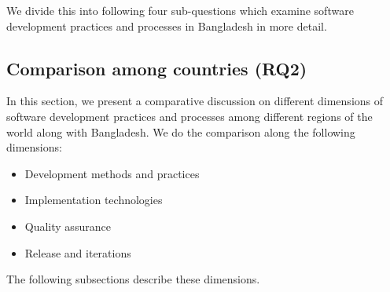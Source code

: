 We divide this into following four sub-questions which examine software development practices and processes in Bangladesh in more detail.






\subsection{Comparison among countries (RQ2)}
\label{RQ2}

In this section, we present a comparative discussion on different dimensions of software development practices and processes among different regions of the world along with Bangladesh. We do the comparison along the following dimensions:

\begin{itemize}
    \item Development methods and practices
    \item Implementation technologies
    \item Quality assurance
    \item Release and iterations
\end{itemize}

The following subsections describe these dimensions.




% 





% 
% 
